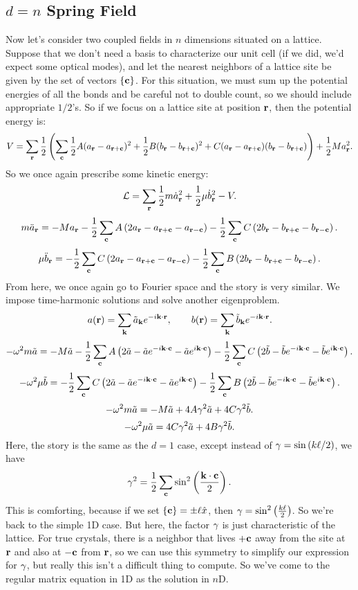 \documentclass[12pt]{article}
\begin{document}
\subsection{$d=n$ Spring Field}
Now let's consider two coupled fields in $n$ dimensions situated on a lattice. Suppose that we don't need a basis to characterize our unit cell (if we did, we'd expect some optical modes), and let the nearest neighbors of a lattice site be given by the set of vectors $\{\mathbf{c}\}$. For this situation, we must sum up the potential energies of all the bonds and be careful not to double count, so we should include appropriate $1/2$'s. So if we focus on a lattice site at position $\mathbf{r}$, then the potential energy is:
\[ V = \sum_{\mathbf{r}} \frac{1}{2}\left(\sum_{\mathbf{c}}\frac{1}{2}A(a_{\mathbf{r}} - a_{\mathbf{r} + \mathbf{c}})^2 + \frac{1}{2}B(b_{\mathbf{r}} - b_{\mathbf{r} + \mathbf{c}})^2 + C(a_{\mathbf{r}} - a_{\mathbf{r}+\mathbf{c}})(b_{\mathbf{r}} - b_{\mathbf{r}+\mathbf{c}})\right) + \frac{1}{2}Ma_{\mathbf{r}}^2.\]
So we once again prescribe some kinetic energy:
\[ \mathcal{L} = \sum_{\mathbf{r}} \frac{1}{2}m \dot{a}_{\mathbf{r}}^2 + \frac{1}{2}\mu \dot{b}_{\mathbf{r}}^2 - V.\]
\[ m\ddot{a}_{\mathbf{r}} = -Ma_{\mathbf{r}} -\frac{1}{2} \sum_{\mathbf{c}} A\left(2 a_{\mathbf{r}} - a_{\mathbf{r} + \mathbf{c}} - a_{\mathbf{r} - \mathbf{c}}\right)-\frac{1}{2}\sum_{\mathbf{c}} C\left(2 b_{\mathbf{r}} - b_{\mathbf{r} + \mathbf{c}} - b_{\mathbf{r} - \mathbf{c}}\right).\]
\[ \mu\ddot{b}_{\mathbf{r}} = -\frac{1}{2} \sum_{\mathbf{c}} C\left(2 a_{\mathbf{r}} - a_{\mathbf{r} + \mathbf{c}} - a_{\mathbf{r} - \mathbf{c}}\right)-\frac{1}{2}\sum_{\mathbf{c}} B\left(2 b_{\mathbf{r}} - b_{\mathbf{r} + \mathbf{c}} - b_{\mathbf{r} - \mathbf{c}}\right).\]
From here, we once again go to Fourier space and the story is very similar. We impose time-harmonic solutions and solve another eigenproblem.
\[ a(\mathbf{r}) = \sum_{\mathbf{k}} \tilde{a}_{\mathbf{k}} e^{-i \mathbf{k}\cdot\mathbf{r}},\qquad b(\mathbf{r}) = \sum_{\mathbf{k}} \tilde{b}_{\mathbf{k}}e^{-i \mathbf{k}\cdot\mathbf{r}}.\]
\[ -\omega^2 m \tilde a = -M \tilde a - \frac{1}{2}\sum_{\mathbf{c}}A \left(2 \tilde a - \tilde a e^{-i\mathbf{k}\cdot\mathbf{c}} - \tilde a e^{i\mathbf{k}\cdot\mathbf{c}}\right) - \frac{1}{2}\sum_{\mathbf{c}}C \left(2 \tilde b - \tilde b e^{-i\mathbf{k}\cdot\mathbf{c}} - \tilde b e^{i\mathbf{k}\cdot\mathbf{c}}\right).\]
\[ -\omega^2 \mu \tilde b =  - \frac{1}{2}\sum_{\mathbf{c}} C\left(2 \tilde a - \tilde a e^{-i\mathbf{k}\cdot\mathbf{c}} - \tilde a e^{i\mathbf{k}\cdot\mathbf{c}}\right) - \frac{1}{2}\sum_{\mathbf{c}} B\left(2 \tilde b - \tilde b e^{-i\mathbf{k}\cdot\mathbf{c}} - \tilde b e^{i\mathbf{k}\cdot\mathbf{c}}\right).\]
\[ -\omega^2 m \tilde a = -M \tilde a + 4A\gamma^2 \tilde a + 4C\gamma^2 \tilde b.\]
\[ -\omega^2 \mu \tilde a = 4C \gamma^2 \tilde a + 4B \gamma^2 \tilde b.\]
Here, the story is the same as the $d=1$ case, except instead of $\gamma = \sin{\left(k\ell/2\right)}$, we have
\[ \gamma^2 = \frac{1}{2} \sum_{\mathbf{c}}\sin^2 \left(\frac{\mathbf{k}\cdot\mathbf{c}}{2}\right).\]
This is comforting, because if we set $\{\mathbf{c}\} = \pm \ell \hat{x}$, then $\gamma = \sin^2\left(\frac{k\ell}{2}\right)$. So we're back to the simple 1D case. But here, the factor $\gamma$ is just characteristic of the lattice. For true crystals, there is a neighbor that lives $+\mathbf{c}$ away from the site at $\mathbf{r}$ and also at $-\mathbf{c}$ from $\mathbf{r}$, so we can use this symmetry to simplify our expression for $\gamma$, but really this isn't a difficult thing to compute. So we've come to the regular matrix equation in 1D as the solution in $n$D.
\end{document}
